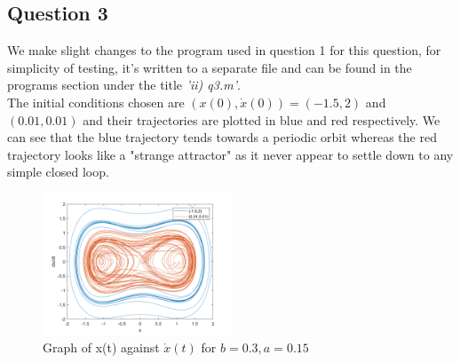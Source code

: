 \documentclass[10pt]{article}
\begin{document}
\subsection*{Question 3}
We make slight changes to the program used in question 1 for this question, for simplicity of testing, it's written to a separate file and can be found in the programs section under the title \emph{'ii) q3.m'}.\\
The initial conditions chosen are $(x(0),\dot{x}(0))=(-1.5,2)$ and $(0.01,0.01)$ and their trajectories are plotted in blue and red respectively. We can see that the blue trajectory tends towards a periodic orbit whereas the red trajectory looks like a "strange attractor" as it never appear to settle down to any simple closed loop.
\begin{figure}[ht]
\centering
\includegraphics[width=0.5\textwidth]{Files/q3.png}
\caption{Graph of x(t) against $\dot{x}(t)$ for $b=0.3, a=0.15$}
\end{figure}

\newpage
\end{document}
